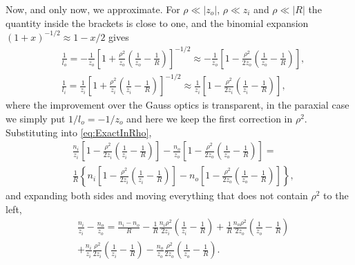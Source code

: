                 Now, and only now, we approximate. For $\rho\ll|z_o|$, $\rho\ll z_i$ and $\rho\ll|R|$ the quantity inside the brackets is close to one, and the binomial expansion $(1+x)^{-1/2}\approx1-x/2$ gives
                \begin{align}
                    & \frac{1}{l_o} = -\frac{1}{z_o}\left[ 1+\frac{\rho^2}{z_o}\left( \frac{1}{z_o}-\frac{1}{R} \right) \right]^{-1/2} \approx -\frac{1}{z_o}\left[ 1 - \frac{\rho^2}{2z_o}\left( \frac{1}{z_o}-\frac{1}{R} \right) \right],\label{eq:BinomialO}\\
                    & \frac{1}{l_i} = \frac{1}{z_i}\left[ 1+\frac{\rho^2}{z_i}\left( \frac{1}{z_i}-\frac{1}{R} \right) \right]^{-1/2} \approx \frac{1}{z_i}\left[ 1 - \frac{\rho^2}{2z_i}\left( \frac{1}{z_i}-\frac{1}{R} \right) \right],\label{eq:BinomialI}
                \end{align}
                where the improvement over the Gauss optics is transparent, in the paraxial case we simply put $1/l_o = -1/z_o$ and here we keep the first correction in $\rho^2$. Substituting into \ref{eq:ExactInRho},
                \begin{align}
                    & \frac{n_i}{z_i}\left[ 1-\frac{\rho^2}{2z_i}\left( \frac{1}{z_i}-\frac{1}{R} \right) \right] - \frac{n_o}{z_o}\left[ 1-\frac{\rho^2}{2z_o}\left( \frac{1}{z_o}-\frac{1}{R} \right) \right] = \nonumber\\
                    & \frac{1}{R}\left\{ n_i\left[ 1-\frac{\rho^2}{2z_i}\left( \frac{1}{z_i}-\frac{1}{R} \right) \right] - n_o\left[ 1-\frac{\rho^2}{2z_o}\left( \frac{1}{z_o}-\frac{1}{R} \right) \right] \right\},\label{eq:AberrationStep1}
                \end{align}
                and expanding both sides and moving everything that does not contain $\rho^2$ to the left,
                \begin{align}
                    & \frac{n_i}{z_i} - \frac{n_o}{z_o} = \frac{n_i-n_o}{R} - \frac{1}{R}\frac{n_i\rho^2}{2z_i}\left( \frac{1}{z_i}-\frac{1}{R} \right) + \frac{1}{R}\frac{n_o\rho^2}{2z_o}\left( \frac{1}{z_o}-\frac{1}{R} \right) \nonumber\\
                    & + \frac{n_i}{z_i}\frac{\rho^2}{2z_i}\left( \frac{1}{z_i}-\frac{1}{R} \right) - \frac{n_o}{z_o}\frac{\rho^2}{2z_o}\left( \frac{1}{z_o}-\frac{1}{R} \right).\label{eq:AberrationStep2}
                \end{align}

